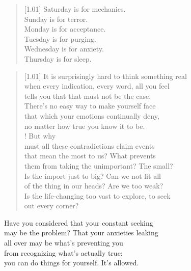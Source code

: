 \null
\vfill
\begin{verse}[1.01\textwidth]
  Saturday is for mechanics.\\
  Sunday is for terror.\\
  Monday is for acceptance.\\
  Tuesday is for purging.\\
  Wednesday is for anxiety.\\
  Thursday is for sleep.
\end{verse}
\vfill

\newpage

\begin{verse}[1.01\textwidth]
  It is surprisingly hard to think something real\\
  when every indication, every word, all you feel\\
  tells you that that must not be the case.\\
  There's no easy way to make yourself face\\
  that which your emotions continually deny,\\
  no matter how true you know it to be.\\!
   But why\\
  must all these contradictions claim events\\
  that mean the most to us? What prevents\\
  them from taking the unimportant? The small?\\
  Is the import just to big? Can we not fit all\\
  of the thing in our heads? Are we too weak?\\
  Is the life-changing too vast to explore, to seek\\
  out every corner?
\end{verse}

\begin{ally}
  Have you considered that your constant seeking\\
  \noindent may be the problem? That your anxieties leaking\\
  \noindent all over may be what's preventing you\\
  \noindent from recognizing what's actually true:\\
  \noindent you can do things for yourself. It's allowed.
\end{ally}

